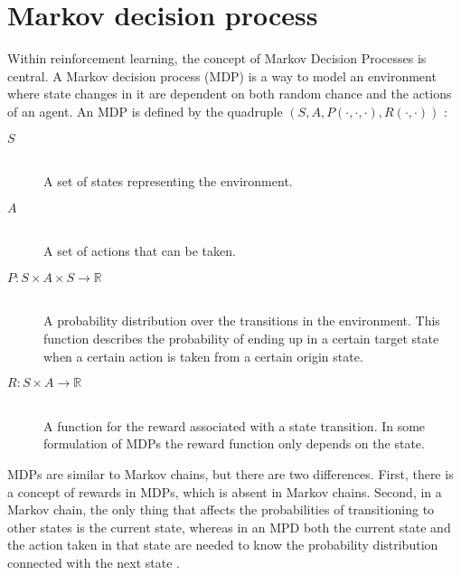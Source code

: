 \section{Markov decision process}

Within reinforcement learning, the concept of Markov Decision Processes is central. A Markov decision process (MDP) is a way to model an environment where state changes in it are dependent on both random chance and the actions of an agent. An MDP is defined by the quadruple $\left( S, A, P( \cdot , \cdot, \cdot ) , R( \cdot , \cdot ) \right)$ \parencite{altman2002applications}: 

\begin{description}
\item[$S$] \hfill \\ 
    A set of states representing the environment.
\item[$A$] \hfill \\ 
    A set of actions that can be taken.
\item[$P \colon S \times A \times S \to \mathbb R$] \hfill \\ 
    A probability distribution over the transitions in the environment. This function describes the probability of ending up in a certain target state when a certain action is taken from a certain origin state. 
\item[$R \colon S \times A \to \mathbb{R}$] \hfill \\ 
    A function for the reward associated with a state transition. In some formulation of MDPs the reward function only depends on the state.
\end{description}

MDPs are similar to Markov chains, but there are two differences. First, there is a concept of rewards in MDPs, which is absent in Markov chains. Second, in a Markov chain, the only thing that affects the probabilities of transitioning to other states is the current state, whereas in an MPD both the current state and the action taken in that state are needed to know the probability distribution connected with the next state \parencite{altman2002applications}.






